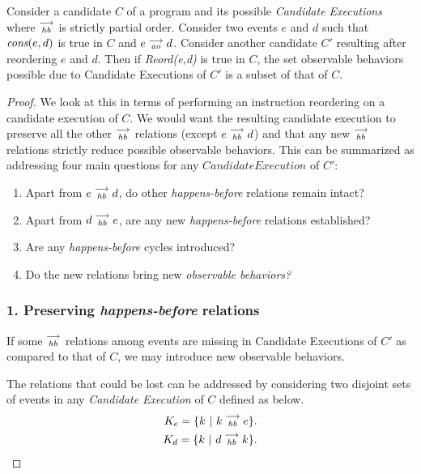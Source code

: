 \begin{theorem} 
    Consider a candidate $C$ of a program and its possible \textit{Candidate Executions} where $\stackrel{\longrightarrow}{_\textit{hb}}$ is strictly partial order. Consider two events $e$ and $d$ such that $\textit{cons}(e,d)$ is true in $C$ and  $e\stackrel{\longrightarrow}{_{\textit{ao}}}d$. Consider another candidate $C'$ resulting after reordering $e$ and $d$. 
    Then if \emph{Reord(e,d)} is true in $C$, the set observable behaviors possible due to Candidate Executions of $C'$ is a subset of that of $C$. 
\end{theorem}

\begin{proof}

    We look at this in terms of performing an instruction reordering on a candidate execution of $C$. We would want the resulting candidate execution to preserve all the other $\stackrel{\longrightarrow}{_{hb}}$ relations (except $e\stackrel{\longrightarrow}{_{\textit{hb}}}d$) and that any new $\stackrel{\longrightarrow}{_{hb}}$ relations strictly reduce possible observable behaviors. This can be summarized as addressing four main questions for any $Candidate Execution$ of $C'$:
    \begin{enumerate}
        \item Apart from $e\stackrel{\longrightarrow}{_{\textit{hb}}}d$, do other \emph{happens-before} relations remain intact?
        \item Apart from $d\stackrel{\longrightarrow}{_{\textit{hb}}}e$, are any new \emph{happens-before} relations established? 
        \item Are any \emph{happens-before} cycles introduced? 
        \item Do the new relations bring new \emph{observable behaviors?}
    \end{enumerate}
    
    
    \subsubsection{1. Preserving \textit{happens-before} relations}
        
        If some $\stackrel{\longrightarrow}{_{hb}}$ relations among events are missing in Candidate Executions of $C'$ as compared to that of $C$, we may introduce new observable behaviors.
        
        The relations that could be lost can be addressed by considering two disjoint sets of events in any \textit{Candidate Execution} of $C$ defined as below.
        \begin{align*}
            K_e = \{k \ | \ k\stackrel{\longrightarrow}{_{\textit{hb}}}e \}. \\
            K_d = \{k \ | \ d\stackrel{\longrightarrow}{_{\textit{hb}}}k \}. 
        \end{align*}
            

\end{proof}
